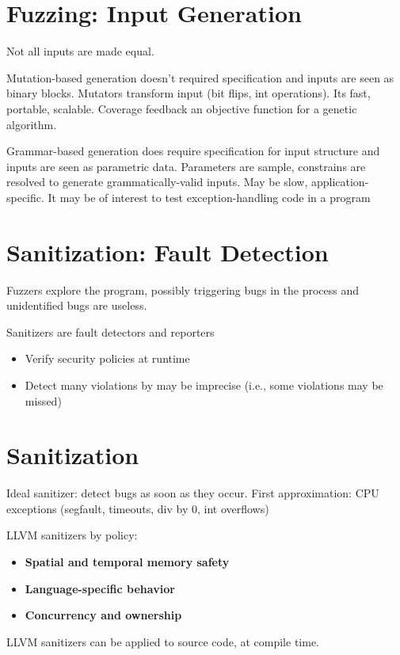 \documentclass[11pt]{article}
\begin{document}
\section*{Fuzzing: Input Generation}

Not all inputs are made equal. 

Mutation-based generation doesn't required specification and inputs are seen as binary blocks. Mutators transform input (bit flips, int operations). Its fast, portable, scalable. Coverage feedback an objective function for a genetic algorithm. 

Grammar-based generation does require specification for input structure and inputs are seen as parametric data. Parameters are sample, constrains are resolved to generate grammatically-valid inputs. May be slow, application-specific. It may be of interest to test exception-handling code in a program

\section*{Sanitization: Fault Detection}

Fuzzers explore the program, possibly triggering bugs in the process and unidentified bugs are useless. 

Sanitizers are fault detectors and reporters
\begin{itemize}
	\item Verify security policies at runtime
	\item Detect many violations by may be imprecise (i.e., some violations may be missed)
\end{itemize}

\section*{Sanitization}

Ideal sanitizer: detect bugs as soon as they occur. First approximation: CPU exceptions (segfault, timeouts, div by 0, int overflows)

LLVM sanitizers by policy:
\begin{itemize}
	\item \textbf{Spatial and temporal memory safety}
	\item \textbf{Language-specific behavior}
	\item \textbf{Concurrency and ownership}
\end{itemize}

LLVM sanitizers can be applied to source code, at compile time. 
\end{document}
